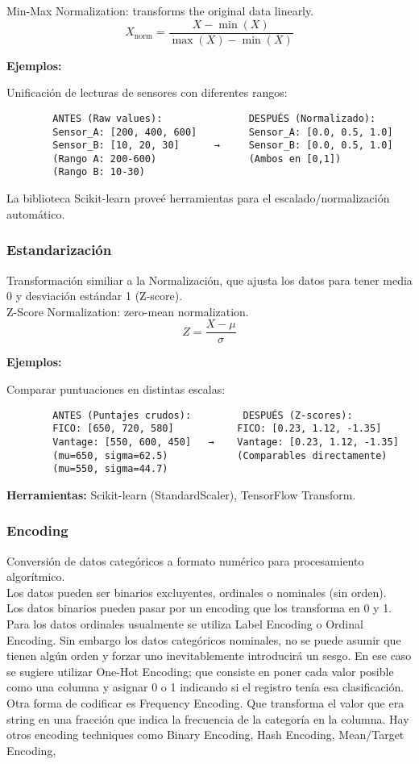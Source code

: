 \documentclass[12pt]{book}
\begin{document}
Min-Max Normalization: transforms the original data linearly.
$$ X_{\text{norm}} = \frac{X - \min(X)}{\max(X) - \min(X)} $$

\textbf{Ejemplos:} 

Unificación de lecturas de sensores con diferentes rangos:

    \begin{verbatim}
        ANTES (Raw values):               DESPUÉS (Normalizado):
        Sensor_A: [200, 400, 600]         Sensor_A: [0.0, 0.5, 1.0]  
        Sensor_B: [10, 20, 30]      →     Sensor_B: [0.0, 0.5, 1.0]
        (Rango A: 200-600)                (Ambos en [0,1])
        (Rango B: 10-30)
    \end{verbatim}

La biblioteca Scikit-learn proveé herramientas para el escalado/normalización automático.

\subsubsection{Estandarización}
Transformación similiar a la Normalización, que ajusta los datos para tener media 0 y desviación estándar 1 (Z-score).\\
Z-Score Normalization: zero-mean normalization.
$$ Z = \frac{X - \mu}{\sigma} $$

\textbf{Ejemplos:} 

Comparar puntuaciones en distintas escalas:
    \begin{verbatim}
        ANTES (Puntajes crudos):         DESPUÉS (Z-scores):
        FICO: [650, 720, 580]           FICO: [0.23, 1.12, -1.35]
        Vantage: [550, 600, 450]   →    Vantage: [0.23, 1.12, -1.35]
        (mu=650, sigma=62.5)            (Comparables directamente)
        (mu=550, sigma=44.7)
    \end{verbatim} 

\textbf{Herramientas:} Scikit-learn (StandardScaler), TensorFlow Transform.

\subsubsection{Encoding}
Conversión de datos categóricos a formato numérico para procesamiento algorítmico.\\
Los datos pueden ser binarios excluyentes, ordinales o nominales (sin orden).\\
Los datos binarios pueden pasar por un encoding que los transforma en 0 y 1.\\
Para los datos ordinales usualmente se utiliza Label Encoding o Ordinal Encoding. 
Sin embargo los datos categóricos nominales, no se puede asumir que tienen algún orden y forzar uno
inevitablemente introducirá un sesgo. En ese caso se sugiere utilizar One-Hot Encoding; que consiste 
en poner cada valor posible como una columna y asignar 0 o 1 indicando si el registro tenía esa clasificación.\\
Otra forma de codificar es Frequency Encoding. Que transforma el valor que era string en una fracción que indica 
la frecuencia de la categoría en la columna.
Hay otros encoding techniques como Binary Encoding, Hash Encoding, Mean/Target Encoding, 
\end{document}
